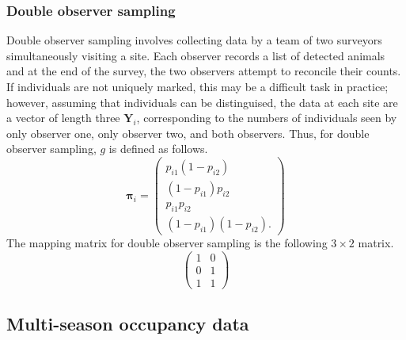 \documentclass[article,shortnames]{jss}
\begin{document}
\subsubsection{Double observer sampling}
\label{sec:double-observ-sampl}

Double observer sampling involves collecting data by a team of two surveyors
simultaneously visiting a site.  Each observer records a list of detected 
animals and at the end of the survey, the two observers attempt to reconcile
their counts.  If individuals are not uniquely marked, this may be a difficult 
task in practice; however, assuming that individuals can be distinguised, the 
data at each site are a vector of length three $\mathbf Y_i$,
corresponding to the numbers of individuals seen by only observer one,
only observer two, and both observers.  Thus, for double observer sampling, 
$g$ is
defined as follows.
\begin{equation}
  \mathbf \pi_i =
  \begin{pmatrix}
    p_{i1}(1-p_{i2}) \\
    (1-p_{i1})p_{i2} \\
    p_{i1}p_{i2} \\
    (1-p_{i1})(1-p_{i2}).
  \end{pmatrix}
\end{equation}
The  mapping matrix for double observer sampling is the
following $3 \times 2$ matrix.
\begin{equation}
  \begin{pmatrix}
    1 & 0 \\
    0 & 1 \\
    1 & 1 
  \end{pmatrix}
\end{equation}


\subsection{Multi-season occupancy data} 
\end{document}
